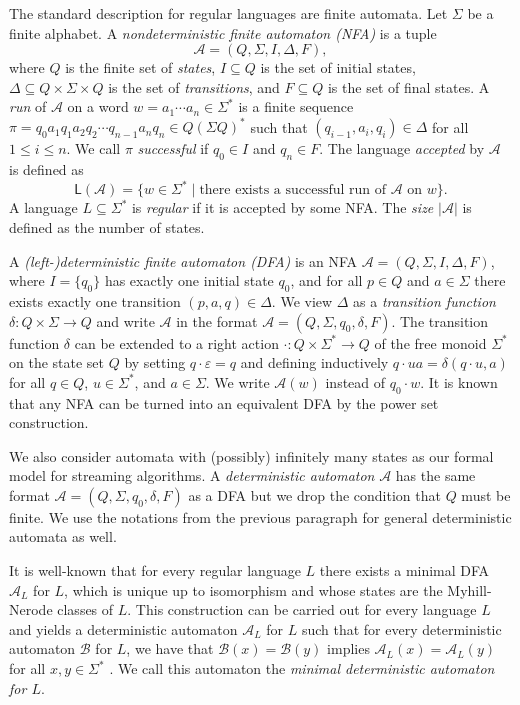 \documentclass{article}\usepackage[a4paper,margin=20mm]{geometry}
\newcommand{\A}{\mathcal{A}}
\newcommand{\B}{\mathcal{B}}
\renewcommand{\L}{\mathsf{L}}
\newcommand{\eps}{\varepsilon}
\renewcommand{\leq}{\leqslant}
\renewcommand{\le}{\leq}
\begin{document}
The standard description for regular languages are finite automata.
Let $\Sigma$ be a finite alphabet.
A {\em nondeterministic finite automaton (NFA)} is a tuple 
\[ \A = (Q,\Sigma,I,\Delta,F), \]
where $Q$ is the finite set of {\em states}, $I \subseteq Q$ is the set of initial states,
$\Delta \subseteq Q \times \Sigma \times Q$ is the set of {\em transitions},
and $F \subseteq Q$ is the set of final states.
A {\em run} of $\A$ on a word $w = a_1 \cdots a_n \in \Sigma^*$ is a finite sequence
$\pi = q_0 a_1 q_1 a_2 q_2 \cdots q_{n-1} a_n q_n \in Q (\Sigma Q)^*$
such that $(q_{i-1},a_i,q_i) \in \Delta$ for all $1 \le i \le n$.
We call $\pi$ {\em successful} if $q_0 \in I$ and $q_n \in F$.
The language {\em accepted} by $\A$ is defined as
\[
	\L(\A) = \{ w \in \Sigma^* \mid \text{there exists a successful run of $\A$ on $w$} \}.
\]
A language $L \subseteq \Sigma^*$ is {\em regular} if it is accepted by
some NFA.
The {\em size} $|\A|$ is defined as the number of states.

A {\em \mbox{(left-)}\allowbreak deterministic finite automaton (DFA)}
is an NFA $\A = (Q,\Sigma,I,\Delta,F)$,
where $I = \{q_0\}$ has exactly one initial state $q_0$,
and for all $p \in Q$ and $a \in \Sigma$ there exists exactly one transition $(p,a,q) \in \Delta$.
We view $\Delta$ as a {\em transition function} $\delta \colon Q \times \Sigma \to Q$
and write $\A$ in the format $\A = (Q,\Sigma,q_0,\delta,F)$.
The transition function $\delta$ can be extended
to a right action $\cdot \colon Q \times \Sigma^* \to Q$
of the free monoid $\Sigma^*$ on the state set $Q$
by setting $q \cdot \eps = q$
and defining inductively $q \cdot ua = \delta(q \cdot u,a)$ for all $q \in Q$,
$u \in \Sigma^*$, and $a \in \Sigma$.
We write $\A(w)$ instead of $q_0 \cdot w$.
It is known that any NFA can be turned into an equivalent DFA by the power set construction.

We also consider automata with (possibly) infinitely many states as our formal model for streaming algorithms.
A {\em deterministic automaton} $\A$ has the same format $\A = (Q,\Sigma,q_0,\delta,F)$
as a DFA but we drop the condition that $Q$ must be finite.
We use the notations from the previous paragraph for general deterministic automata as well.

It is well-known that for every regular language $L$ there exists a minimal DFA $\A_L$ for $L$,
which is unique up to isomorphism and whose states are the Myhill-Nerode classes of $L$.
This construction can be carried out for every language $L$ and yields a
deterministic automaton $\A_L$ for $L$ such that for every deterministic automaton $\B$ 
for $L$, we have that $\B(x) = \B(y)$ implies $\A_L(x) = \A_L(y)$ for all $x,y \in \Sigma^*$ \cite[Chapter~III,~Theorem~5.2]{Eilenberg74}.
We call this automaton the {\em minimal deterministic automaton for $L$}.
\end{document}
